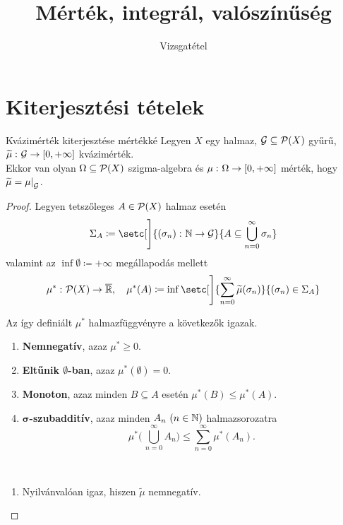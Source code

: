 \documentclass[
]{elteikthesis}[2024/04/26]
\title{Mérték, integrál, valószínűség} %
\subtitle{\circled{8} Vizsgatétel}
\begin{document}
	
	
	\section{Kiterjesztési tételek}
	
	\begin{theorem}{Kvázimérték kiterjesztése mértékké}{}
		Legyen \( X \) egy halmaz, 
		\( \mathcal{G} \subseteq \mathcal{P}( X ) \) gyűrű, 
		\( \widetilde{\mu}  \,\colon  \mathcal{G}  \to  [0, +\infty] \) kvázimérték.\\
		Ekkor van olyan \( \Omega \subseteq \mathcal{P}( X ) \) szigma-algebra és 
		\( \mu  \,\colon  \Omega  \to  [0, +\infty] \) mérték, 
		hogy \( \widetilde{\mu} = \restr{\mu}{\ring{G}} \).
	\end{theorem}
	\begin{proof}
		Legyen tetszőleges \( A \in \mathcal{P}( X ) \) halmaz esetén
		\[
			\Sigma_A \coloneq 
			\setc[\Bigg]{ \func{(\sigma_n)}{ \N }{ \ring{G} }}{ A \subseteq \bigcup_{n=0}^\infty \sigma_n }
		\]
		valamint az \( \inf \emptyset \coloneq +\infty \) megállapodás mellett
		\[
			\func{ \mu^* }{ \powerset{X} }{ \overline{\R} }, \quad
			\mu^*(A) \coloneq
			\inf \setc[\Bigg]{ \sum_{n=0}^{\infty} \widetilde{\mu}( \sigma_n ) }
                { (\sigma_n) \in \Sigma_A }
		\]
		\begin{tcolorbox}[colback=green!10, colframe=green!80]
			\begin{lem*}
				Az így definiált \( \mu^* \) halmazfüggvényre a következők igazak.
				\begin{enumerate}
					\item 
					\textbf{Nemnegatív}, azaz \( \mu^* \geq 0 \).
					
					\item 
					\textbf{Eltűnik \( \boldsymbol{\emptyset} \)-ban}, azaz
					\( \mu^*(\emptyset) = 0 \).
					
					\item 
					\textbf{Monoton}, 
					azaz minden \( B \subseteq A \) esetén \( \mu^*(B) \leq \mu^*(A) \).
					
					\item\label{eq:mu-csillag-szubadditív}
					\textbf{\( \boldsymbol{\sigma} \)-szubadditív}, 
					azaz minden \( A_n \ (n \in \mathbb{N} ) \) halmazsorozatra
					\[
						\mu^* \Biggl( \, \bigcup\limits_{n=0}^\infty A_n \Biggr) \leq 
						\sum\limits_{n=0}^{\infty} \mu^*(A_n).
					\]
				\end{enumerate}
			\end{lem*}
		\end{tcolorbox}
		\begin{proof*}\,
			\begin{enumerate}
				\item 
				Nyilvánvalóan igaz, hiszen \( \widetilde{\mu} \) nemnegatív.
				

\end{enumerate}
\end{proof*}
\end{proof}
\end{document}
